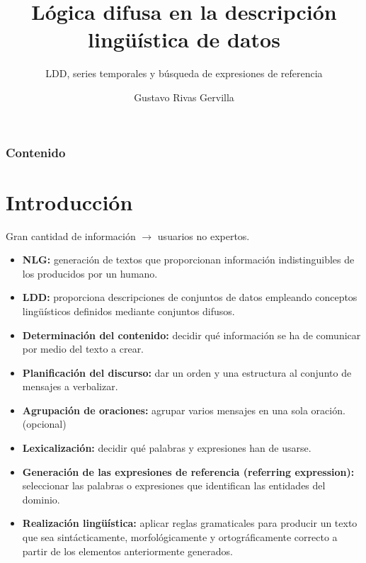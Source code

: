 \documentclass{beamer}
\date{} %
\author{Gustavo Rivas Gervilla}
\title{Lógica difusa en la descripción lingüística de datos}
\subtitle{LDD, series temporales y búsqueda de expresiones de referencia}
\institute{
	Escuela Técnica Superior de Ingeniería Informática y Telecomunicaciones	
}
\begin{document}
	\begin{frame}[plain]
		\titlepage
	\end{frame}
	
	\begin{frame}[plain]
		\frametitle{Contenido}
		\tableofcontents
	\end{frame}
	
	
	\section{Introducción}
	
	\begin{frame}
		Gran cantidad de información $\longrightarrow$ usuarios no expertos.
		
		\begin{itemize}
			\item \textbf{NLG:} generación de textos que proporcionan información indistinguibles de los producidos por un humano.
			\item \textbf{LDD:} proporciona descripciones de conjuntos de datos empleando conceptos lingüísticos definidos mediante conjuntos difusos.
		\end{itemize}		
	\end{frame}
	
	\begin{frame}
		\begin{itemize}
			\item \textbf{Determinación del contenido:} decidir qué información se ha de comunicar por medio del texto a crear.
			\item \textbf{Planificación del discurso:} dar un orden y una estructura al conjunto de mensajes a verbalizar.
			\item \textbf{Agrupación de oraciones:} agrupar varios mensajes en una sola oración. (opcional)
			\item \textbf{Lexicalización:} decidir qué palabras y expresiones han de usarse.
			\item \textbf{Generación de las expresiones de referencia (referring expression):} seleccionar las palabras o expresiones que identifican las entidades del dominio.
			\item \textbf{Realización lingüística:} aplicar reglas gramaticales para producir un texto que sea sintácticamente, morfológicamente y ortográficamente correcto a partir de los elementos anteriormente generados.
\end{itemize}
	\end{frame}
	
\end{document}
